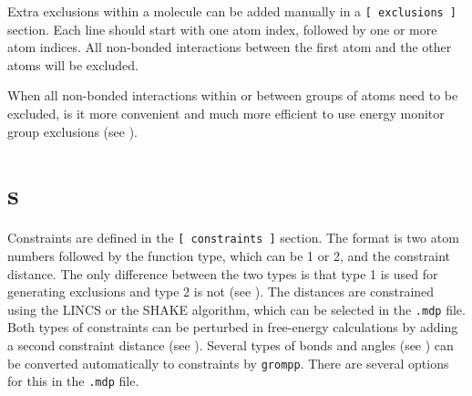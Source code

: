 Extra exclusions within a molecule can be added manually
in a {\tt [~exclusions~]} section. Each line should start with one
atom index, followed by one or more atom indices. All non-bonded
interactions between the first atom and the other atoms will be excluded.

When all non-bonded interactions within or between groups of atoms need
to be excluded, is it more convenient and much more efficient to use
energy monitor group exclusions (see ).

\section{s}
\label{sec:constraints}
Constraints are defined in the {\tt [~constraints~]} section.
The format is two atom numbers followed by the function type,
which can be 1 or 2, and the constraint distance.
The only difference between the two types is that type 1 is used
for generating exclusions and type 2 is not (see ).
The distances are constrained using the LINCS or the SHAKE algorithm,
which can be selected in the {\tt *.mdp} file.
Both types of constraints can be perturbed in free-energy calculations
by adding a second constraint distance (see ).
Several types of bonds and angles (see ) can
be converted automatically to constraints by {\tt grompp}.
There are several options for this in the {\tt *.mdp} file.

